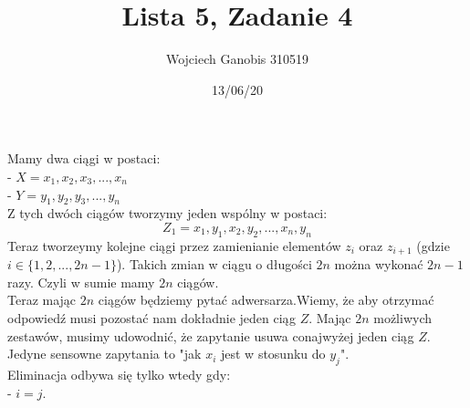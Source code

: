 \documentclass{article}
\title{Lista 5, Zadanie 4}
\author{Wojciech Ganobis 310519}
\date{13/06/20}
\newcommand\tab[1][1cm]{\hspace*{#1}}
\begin{document}
\maketitle

Mamy dwa ciągi w postaci:\\
- $X = x_1, x_2, x_3, ..., x_n$\\
- $Y = y_1, y_2, y_3, ..., y_n$\\
Z tych dwóch ciągów tworzymy jeden wspólny w postaci:\\
$$Z_1 = x_1, y_1, x_2, y_2, ..., x_n, y_n$$
Teraz tworzeymy kolejne ciągi przez zamienianie elementów $z_i$ oraz $z_{i+1}$ (gdzie $i \in \{1, 2, ..., 2n-1\}$). Takich zmian w ciągu o długości $2n$ można wykonać $2n-1$ razy. Czyli w sumie mamy $2n$ ciągów.\\

Teraz mając $2n$ ciągów będziemy pytać adwersarza.Wiemy, że aby otrzymać odpowiedź musi pozostać nam dokładnie jeden ciąg $Z$. Mając $2n$ możliwych zestawów, musimy udowodnić, że zapytanie usuwa conajwyżej jeden ciąg $Z$.\\

Jedyne sensowne zapytania to "jak $x_i$ jest w stosunku do $y_j$".\\
Eliminacja odbywa się tylko wtedy gdy:\\
\tab - $i = j$. 
\end{document}
